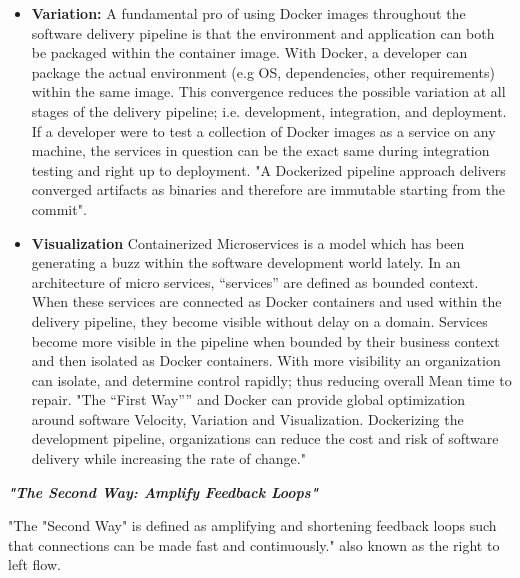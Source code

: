 \begin{itemize}
\begin{itemize}
	\end{itemize}
\item \textbf{Variation:}
	A fundamental pro of using Docker images throughout the software delivery pipeline is that the environment and application can both be packaged within the container image. With Docker, a developer can package the actual environment (e.g OS, dependencies, other requirements) within the same image. This convergence reduces the possible variation at all stages of the delivery pipeline; i.e. development, integration, and  deployment\cite{willis}. If a developer were to test a collection of Docker images as a service on any machine, the services in question can be the exact same during integration testing and right up to deployment. "A Dockerized pipeline approach delivers converged artifacts as binaries and therefore are immutable starting from the commit"\cite{willis}.
\item \textbf{Visualization}
	Containerized Microservices is a model which has been generating a buzz within the software development world lately. In an architecture of micro services, “services” are defined as bounded context. When these services are connected as Docker containers and used within the delivery pipeline, they become visible without delay on a domain. Services become more visible in the pipeline when bounded by their business context and then isolated as Docker containers. With more visibility an organization can isolate, and determine control rapidly; thus reducing overall Mean time to repair\cite{willis}.
    "The “First Way”” and Docker can provide global optimization around software Velocity, Variation and Visualization. Dockerizing the development pipeline, organizations can reduce the cost and risk of software delivery while increasing the rate of change."\cite{willis} 
\end{itemize}

\textbf{\emph{"The Second Way: Amplify Feedback Loops"}}

"The "Second Way" is defined as amplifying and shortening feedback loops such that connections can be made fast and continuously."\cite{willis} also known as the right to left flow.

